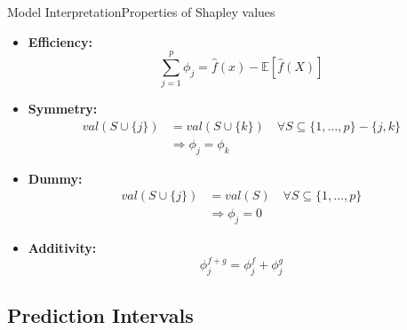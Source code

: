 \documentclass{beamer}
\begin{document}
        \begin{frame}{Model Interpretation}{Properties of Shapley values}

            \begin{itemize}
                \item \textbf{Efficiency:}\begin{equation*}
                    \sum_{j=1}^{p} \phi_j = \hat{f}(x) - \mathbb{E}[\hat{f}(X)]
                \end{equation*}
                \item \textbf{Symmetry:} \begin{equation*}
                    \begin{split}
                        val(S \cup \{j\}) & = val(S \cup \{k\}) \quad \forall S \subseteq \{1, \dots, p\} - \{j, k\} \\
                        & \Rightarrow \phi_j = \phi_k
                    \end{split}
                \end{equation*}
                \item \textbf{Dummy:}  \begin{equation*}
                    \begin{split}
                        val(S \cup \{j\}) & = val(S) \quad \forall S \subseteq \{1, \dots, p\} \\
                        & \Rightarrow \phi_j = 0
                    \end{split}
                \end{equation*}
                \item \textbf{Additivity:} \begin{equation*}
                    \phi_j^{f + g} = \phi_j^{f} + \phi_j^{g}
                \end{equation*}
            \end{itemize}
        \end{frame}

        \subsection{Prediction Intervals}
\end{document}
